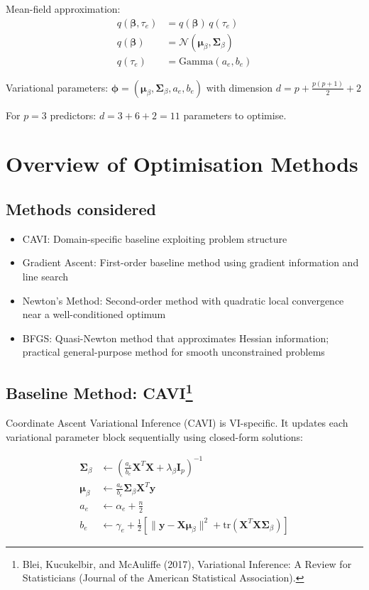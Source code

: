 \documentclass[11pt]{article}
\newcommand{\N}{\mathcal{N}}
\newcommand{\tr}{\text{tr}}
\begin{document}
Mean-field approximation:
\begin{align}
q(\bm{\beta}, \tau_e) &= q(\bm{\beta}) \, q(\tau_e)\\
q(\bm{\beta}) &= \N(\bm{\mu}_\beta, \bm{\Sigma}_\beta)\\
q(\tau_e) &= \text{Gamma}(a_e, b_e)
\end{align}

Variational parameters: $\bm{\phi} = (\bm{\mu}_\beta, \bm{\Sigma}_\beta, a_e, b_e)$ with dimension $d = p + \frac{p(p+1)}{2} + 2$

For $p=3$ predictors: $d = 3 + 6 + 2 = 11$ parameters to optimise.
 
\section*{Overview of Optimisation Methods}

\subsection*{Methods considered}

\begin{itemize}
\item CAVI: Domain-specific baseline exploiting problem structure
\item Gradient Ascent: First-order baseline method using gradient information and line search
\item Newton's Method: Second-order method with quadratic local convergence near a well-conditioned optimum
\item BFGS: Quasi-Newton method that approximates Hessian information; practical general-purpose method for smooth unconstrained problems
\end{itemize}

\subsection*{Baseline Method: CAVI\footnote{Blei, Kucukelbir, and McAuliffe (2017), Variational Inference: A Review for Statisticians (Journal of the American Statistical Association).}}

Coordinate Ascent Variational Inference (CAVI) is VI-specific. It updates each variational parameter block sequentially using closed-form solutions:

\begin{align}
\bm{\Sigma}_\beta &\leftarrow \left(\frac{a_e}{b_e} \bm{X}^T\bm{X} + \lambda_\beta \bm{I}_p\right)^{-1}\\
\bm{\mu}_\beta &\leftarrow \frac{a_e}{b_e} \bm{\Sigma}_\beta \bm{X}^T\bm{y}\\
a_e &\leftarrow \alpha_e + \frac{n}{2}\\
b_e &\leftarrow \gamma_e + \frac{1}{2}\left[\|\bm{y} - \bm{X}\bm{\mu}_\beta\|^2 + \tr(\bm{X}^T\bm{X}\bm{\Sigma}_\beta)\right]
\end{align}
\end{document}
